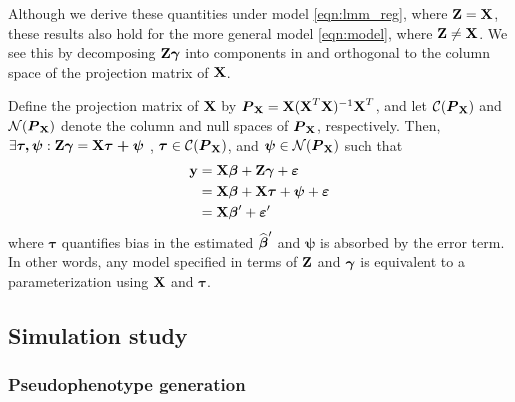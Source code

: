 Although we derive these quantities under model \eqref{eqn:lmm_reg}, where $\textbf{Z} = \textbf{X}$, these results also hold for the more general model \eqref{eqn:model}, where $\textbf{Z} \ne \textbf{X}$. We see this by decomposing $\textbf{Z} \boldsymbol{\gamma}$ into components in and orthogonal to the column space of the projection matrix of $\textbf{X}$. 

Define the projection matrix of $\textbf{X}$ by $\boldsymbol{P}_{\textbf{X}} = \textbf{X} (\textbf{X}^T \textbf{X})^{-1} \textbf{X}^T$, and let $\mathcal{C}(\boldsymbol{P}_{\textbf{X}})$ and $\mathcal{N}(\boldsymbol{P}_{\textbf{X}})$ denote the column and null spaces of $\boldsymbol{P}_{\textbf{X}}$, respectively. Then, $\exists \boldsymbol{\tau, \psi}: \textbf{Z} \boldsymbol{\gamma} = \textbf{X} \boldsymbol{\tau + \psi}$ , $\boldsymbol{\tau} \in \mathcal{C}(\boldsymbol{P}_{\textbf{X}})$, and $\boldsymbol{\psi} \in \mathcal{N}(\boldsymbol{P}_{\textbf{X}})$ such that
\begin{align*}
    \textbf{y} &= \textbf{X}\boldsymbol{\beta} + \textbf{Z}\boldsymbol{\gamma} + \boldsymbol{\varepsilon}\\
    &= \textbf{X}\boldsymbol{\beta} + \textbf{X} \boldsymbol{\tau} + \boldsymbol{\psi} + \boldsymbol{\varepsilon}\\
    &=  \textbf{X} \boldsymbol{\beta}' + \boldsymbol{\varepsilon}'
\end{align*}
where $\boldsymbol{\tau}$ quantifies bias in the estimated $\widehat{\boldsymbol{\beta}}'$ and $\boldsymbol{\psi}$ is absorbed by the error term. In other words, any model specified in terms of $\textbf{Z}$ and $\boldsymbol{\gamma}$ is equivalent to a parameterization using $\textbf{X}$ and $\boldsymbol{\tau}$.

\subsection{Simulation study}
\subsubsection{Pseudophenotype generation}

